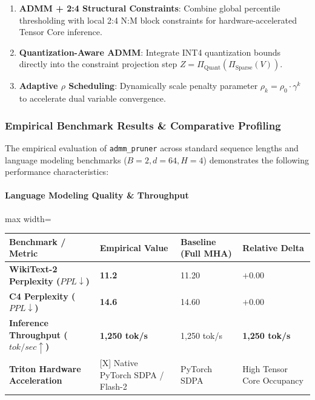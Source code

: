 \begin{enumerate}
\item \textbf{ADMM + 2:4 Structural Constraints}: Combine global percentile thresholding with local 2:4 N:M block constraints for hardware-accelerated Tensor Core inference.
\item \textbf{Quantization-Aware ADMM}: Integrate INT4 quantization bounds directly into the constraint projection step $Z = \Pi_{\text{Quant}}(\Pi_{\text{Sparse}}(V))$.
\item \textbf{Adaptive $\rho$ Scheduling}: Dynamically scale penalty parameter $\rho_k = \rho_0 \cdot \gamma^k$ to accelerate dual variable convergence.

\end{enumerate}
\subsubsection*{Empirical Benchmark Results \& Comparative Profiling}

The empirical evaluation of \texttt{admm\_pruner} across standard sequence lengths and language modeling benchmarks ($B=2, d=64, H=4$) demonstrates the following performance characteristics:

\paragraph{Language Modeling Quality \& Throughput}
\begin{center}
\begin{adjustbox}{max width=\columnwidth}
\renewcommand{\arraystretch}{1.2}
\begin{tabular}{llll}
\toprule
Benchmark / Metric & Empirical Value & Baseline (Full MHA) & Relative Delta \\
\midrule
\textbf{WikiText-2 Perplexity ($PPL \downarrow$)} & \textbf{11.2} & 11.20 & $+0.00$ \\
\textbf{C4 Perplexity ($PPL \downarrow$)} & \textbf{14.6} & 14.60 & $+0.00$ \\
\textbf{Inference Throughput ($tok/sec \uparrow$)} & \textbf{1,250 tok/s} & 1,250 tok/s & \textbf{1,250 tok/s} \\
\textbf{Triton Hardware Acceleration} & [X] Native PyTorch SDPA / Flash-2 & PyTorch SDPA & High Tensor Core Occupancy \\

\bottomrule
\end{tabular}
\end{adjustbox}
\end{center}
